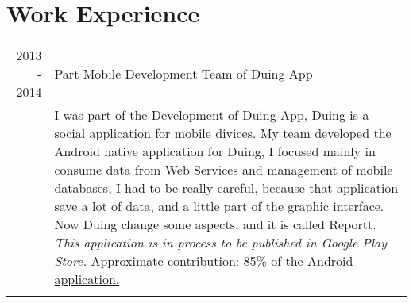 \documentclass[a4paper,10pt]{article} %
\begin{document}

\section{Work Experience}

\begin{tabular}{r|p{11cm}}

\textsc{2013 - 2014} & Part Mobile Development Team of Duing App\\
& \footnotesize{I was part of the Development of Duing App, Duing is a social application for mobile divices.
My team developed the Android native application for Duing, I focused mainly in consume data from Web Services and management of mobile databases, I had to be really careful, because that application save a lot of data,
and a little part of the graphic interface. Now Duing change some aspects, and it is called Reportt. \textit{This application is in process to be published in Google Play Store.} \underline{Approximate contribution: 85\% of the Android application.}}\\
\multicolumn{2}{c}{} \\
\end{tabular}

\end{document}

